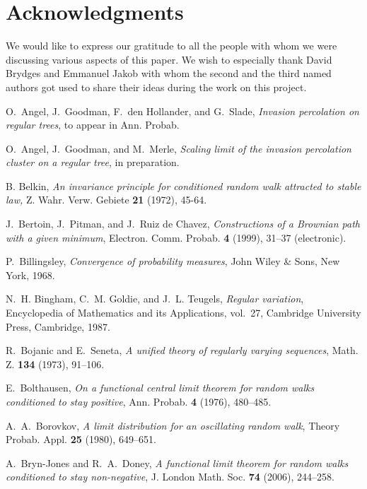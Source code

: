 \documentclass[12pt]{amsart}
\begin{document}
\section*{Acknowledgments}
We would like to express our gratitude to all the people with whom we were discussing various aspects
of this paper. We wish to especially thank David Brydges and Emmanuel Jakob with whom
the second and the third named authors got used to share their ideas during the work on this project.
\providecommand{\bysame}{\leavevmode\hbox to3em{\hrulefill}\thinspace}
\begin{thebibliography}{100}
O.~Angel, J.~Goodman, F.~den Hollander, and G.~Slade, \emph{Invasion
percolation on regular trees}, to appear in Ann. Probab.

O.~Angel, J.~Goodman, and M.~Merle, \emph{Scaling limit of the
invasion percolation cluster on a regular tree}, in preparation.

B. Belkin,
\emph{An invariance principle for conditioned random walk attracted to stable law,}
Z. Wahr. Verw. Gebiete \textbf{21} (1972), 45-64.

J.~Bertoin, J.~Pitman, and J.~Ruiz de Chavez,
\emph{Constructions of a Brownian path with a given minimum},
Electron. Comm. Probab. \textbf{4} (1999), 31--37 (electronic).

P.~Billingsley, \emph{Convergence of probability measures}, John Wiley \&
Sons, New York, 1968.

N.~H. Bingham, C.~M. Goldie, and J.~L. Teugels, \emph{Regular variation},
Encyclopedia of Mathematics and its Applications, vol.~27, Cambridge
University Press, Cambridge, 1987.

R.~Bojanic and E.~Seneta, \emph{A unified theory of regularly varying
sequences}, Math. Z. \textbf{134} (1973), 91--106.

E.~Bolthausen,
\emph{On a functional central limit theorem for random walks
conditioned to stay positive}, Ann. Probab. \textbf{4} (1976), 480--485.

A.~A.~Borovkov, \emph{A limit distribution for an oscillating random walk},
Theory Probab. Appl. \textbf{25} (1980), 649--651.

A.~Bryn-Jones and R.~A.~Doney,
\emph{A functional limit theorem for random walks conditioned to stay
non-negative}, J. London Math. Soc. \textbf{74} (2006), 244--258.


\end{thebibliography}
\end{document}
